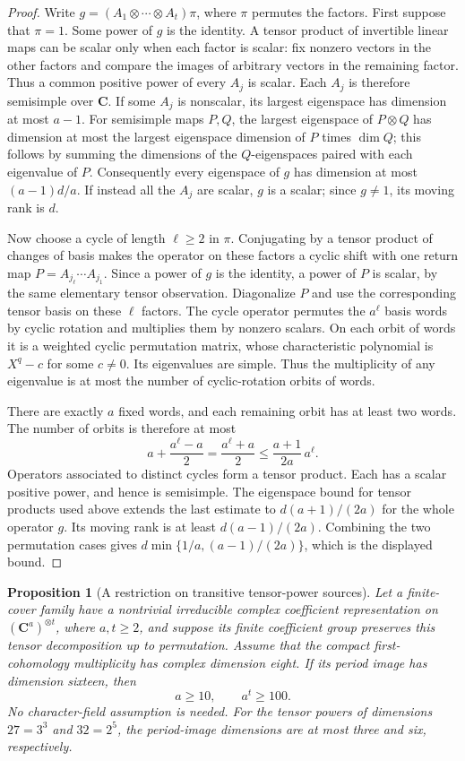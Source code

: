 \documentclass[11pt]{article}
\newtheorem{proposition}[theorem]{Proposition}
\theoremstyle{definition}
\theoremstyle{remark}
\begin{document}
\begin{proof}
Write $g=(A_1\otimes\cdots\otimes A_t)\pi$, where $\pi$
permutes the factors.  First suppose that $\pi=1$.
Some power of $g$ is the identity.  A tensor product of invertible
linear maps can be scalar only when each factor is scalar:
fix nonzero vectors in the other factors and compare the images
of arbitrary vectors in the remaining factor.  Thus a common
positive power of every $A_j$ is scalar.  Each $A_j$ is therefore
semisimple over $\mathbf C$.  If some $A_j$ is nonscalar, its
largest eigenspace has dimension at most $a-1$.  For semisimple
maps $P,Q$, the largest eigenspace of $P\otimes Q$ has dimension
at most the largest eigenspace dimension of $P$ times $\dim Q$;
this follows by summing the dimensions of the $Q$-eigenspaces
paired with each eigenvalue of $P$.  Consequently every eigenspace
of $g$ has dimension at most $(a-1)d/a$.  If instead all the
$A_j$ are scalar, $g$ is a scalar; since $g\ne1$, its moving
rank is $d$.

Now choose a cycle of length $\ell\geq2$ in $\pi$.
Conjugating by a tensor product of changes of basis makes the
operator on these factors a cyclic shift with one return map
$P=A_{j_\ell}\cdots A_{j_1}$.  Since a power of $g$ is the
identity, a power of $P$ is scalar, by the same elementary tensor
observation.  Diagonalize $P$ and use the corresponding tensor
basis on these $\ell$ factors.  The cycle operator permutes the
$a^\ell$ basis words by cyclic rotation and multiplies them by
nonzero scalars.  On each orbit of words it is a weighted cyclic
permutation matrix, whose characteristic polynomial is
$X^q-c$ for some $c\ne0$.  Its eigenvalues are simple.
Thus the multiplicity of any eigenvalue is at most the number
of cyclic-rotation orbits of words.

There are exactly $a$ fixed words, and each remaining orbit has
at least two words.  The number of orbits is therefore at most
\[
 a+\frac{a^\ell-a}{2}=\frac{a^\ell+a}{2}
       \leq\frac{a+1}{2a}\,a^\ell.
\]
Operators associated to distinct cycles form a tensor product.
Each has a scalar positive power, and hence is semisimple.
The eigenspace bound for tensor products used above extends the
last estimate to $d(a+1)/(2a)$ for the whole operator $g$.
Its moving rank is at least $d(a-1)/(2a)$.
Combining the two permutation cases gives
$d\min\{1/a,(a-1)/(2a)\}$, which is the displayed bound.
\end{proof}

\begin{proposition}[A restriction on transitive tensor-power sources]
\label{prop:permuted-tensor100}
Let a finite-cover family have a nontrivial irreducible complex
coefficient representation on $(\mathbf C^a)^{\otimes t}$,
where $a,t\geq2$, and suppose its finite coefficient group
preserves this tensor decomposition up to permutation.
Assume that the compact first-cohomology multiplicity has
complex dimension eight.  If its period image has dimension
sixteen, then
\[
                         a\geq10,\qquad a^t\geq100.
\]
No character-field assumption is needed.  For the tensor powers
of dimensions $27=3^3$ and $32=2^5$, the period-image dimensions
are at most three and six, respectively.
\end{proposition}
\end{document}
